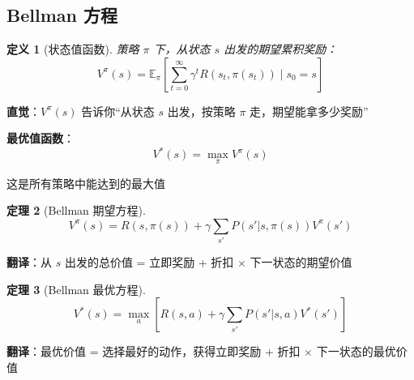 \documentclass[12pt, a4paper]{ctexart}
\newtheorem{theorem}{定理}[section]
\newtheorem{definition}[theorem]{定义}
\begin{document}
\subsection{Bellman 方程}

\begin{blackboard}

\begin{definition}[状态值函数]
策略 $\pi$ 下，从状态 $s$ 出发的期望累积奖励：
\[
V^\pi(s) = \mathbb{E}_\pi \left[ \sum_{t=0}^\infty \gamma^t R(s_t, \pi(s_t)) \mid s_0 = s \right]
\]
\end{definition}

\textbf{直觉}：$V^\pi(s)$ 告诉你``从状态 $s$ 出发，按策略 $\pi$ 走，期望能拿多少奖励''

\textbf{最优值函数}：
\[
V^*(s) = \max_\pi V^\pi(s)
\]

这是所有策略中能达到的最大值

\end{blackboard}

\begin{blackboard}

\begin{theorem}[Bellman 期望方程]
\[
V^\pi(s) = R(s, \pi(s)) + \gamma \sum_{s'} P(s' | s, \pi(s)) V^\pi(s')
\]
\end{theorem}

\textbf{翻译}：从 $s$ 出发的总价值 = 立即奖励 + 折扣 $\times$ 下一状态的期望价值

\begin{theorem}[Bellman 最优方程]
\[
V^*(s) = \max_a \left[ R(s, a) + \gamma \sum_{s'} P(s' | s, a) V^*(s') \right]
\]
\end{theorem}

\textbf{翻译}：最优价值 = 选择最好的动作，获得立即奖励 + 折扣 $\times$ 下一状态的最优价值

\end{blackboard}
\end{document}
